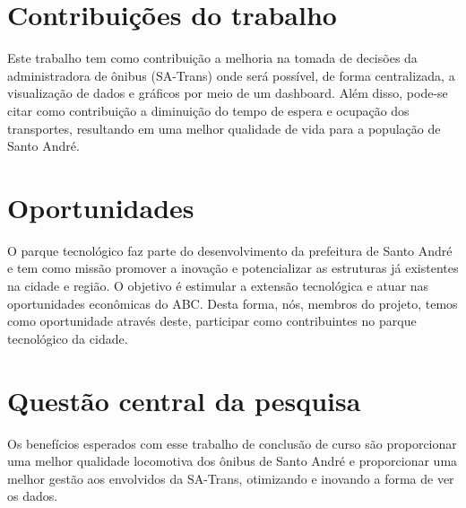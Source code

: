 \section{Contribuições do trabalho}
\indent
\par Este trabalho tem como contribuição a melhoria na tomada de decisões da administradora de ônibus (SA-Trans) onde será possível, de forma centralizada, a visualização de dados e gráficos por meio de um dashboard. Além disso, pode-se citar como contribuição a diminuição do tempo de espera e ocupação dos transportes, resultando em uma melhor qualidade de vida para a população de Santo André.

\section{Oportunidades}
\indent
\par O parque tecnológico faz parte do desenvolvimento da prefeitura de Santo André e tem como missão promover a inovação e potencializar as estruturas já existentes na cidade e região. O objetivo é estimular a extensão tecnológica e atuar nas oportunidades econômicas do ABC.
Desta forma, nós, membros do projeto, temos como oportunidade através deste, participar como contribuintes no parque tecnológico da cidade.

\section{Questão central da pesquisa}
\indent
\par Os benefícios esperados com esse trabalho de conclusão de curso são proporcionar uma melhor qualidade locomotiva dos ônibus de Santo André e proporcionar uma melhor gestão aos envolvidos da SA-Trans, otimizando e inovando a forma de ver os dados.
\begin{comment}
\section{Sustentabilidade e Impacto ambiental}
\indent
\par Nas grandes cidades o problema da poluição do ar tem-se agravado cada vez mais ameaçando à qualidade de vida de seus habitantes. A poluição carrega diversas substâncias tóxicas que, em contato com o sistema respiratório, podem produzir vários efeitos negativos sobre a saúde.
\par Em geral, os veículos automotores são os principais causadores dessa poluição. Com o auxílio da inteligência artificial e de analytics presentes no dashboard que será disponibilizado, a quantidade de ônibus da cidade poderá sofrer uma possível redução da frota em momentos oportunos. Essa redução pode impactar diretamente e positivamente na emissão de gases para a atmosfera.
\end{comment}
